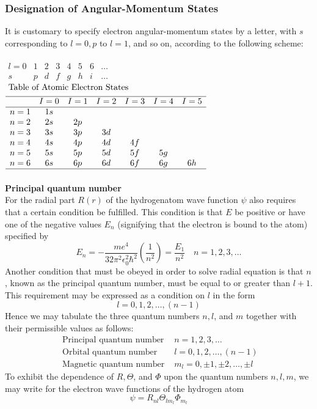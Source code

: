 \subsubsection{Designation of Angular-Momentum States}
It is customary to specify electron angular-momentum states by a letter, with $s$ corresponding to $l=0, p$ to $l=1$, and so on, according to the following scheme:\\\\
$\begin{array}{rlllllll}
	l=0 & 1 & 2 & 3 & 4 & 5 & 6 & \ldots \\
	s & p & d & f & g & h & i & \ldots
\end{array}$\\
$\begin{aligned}
	&\text { Table of Atomic Electron States }\\
	&\begin{array}{lcccccc}
		\hline & I=0 & I=1 & I=2 & I=3 & I=4 & I=5 \\
		\hline n=1 & 1 s & & & & & \\
		n=2 & 2 s & 2 p & & & & \\
		n=3 & 3 s & 3 p & 3 d & & & \\
		n=4 & 4 s & 4 p & 4 d & 4 f & & \\
		n=5 & 5 s & 5 p & 5 d & 5 f & 5 g & \\
		n=6 & 6 s & 6 p & 6 d & 6 f & 6 g & 6 h \\
		\hline
	\end{array}
\end{aligned}$\\\\
\textbf{Principal quantum number}\\
 For the radial part $R(r)$ of the hydrogenatom wave function $\psi$ also requires that a certain condition be fulfilled. This condition is that $E$ be positive or have one of the negative values $E_{n}$ (signifying that the electron is bound to the atom) specified by
$$
E_{n}=-\frac{m e^{4}}{32 \pi^{2} \epsilon_{0}^{2} \hbar^{2}}\left(\frac{1}{n^{2}}\right)=\frac{E_{1}}{n^{2}} \quad n=1,2,3, \ldots
$$
Another condition that must be obeyed in order to solve radial equation is that $n$, known as the principal quantum number, must be equal to or greater than $l+1$. This requirement may be expressed as a condition on $l$ in the form
$$
l=0,1,2, \ldots,(n-1)
$$
Hence we may tabulate the three quantum numbers $n, l$, and $m$ together with their permissible values as follows:\\
$$\begin{array}{lc}
	\text { Principal quantum number } & n=1,2,3, \ldots \\
	\text { Orbital quantum number } & l=0,1,2, \ldots,(n-1) \\
	\text { Magnetic quantum number } & m_{l}=0, \pm 1, \pm 2, \ldots, \pm l
\end{array}$$
To exhibit the dependence of $R, \Theta$, and $\Phi$ upon the quantum numbers $n, l, m$, we may write for the electron wave functions of the hydrogen atom
$$
\psi=R_{n l} \Theta_{l m_{l}} \Phi_{m_{l}}
$$
